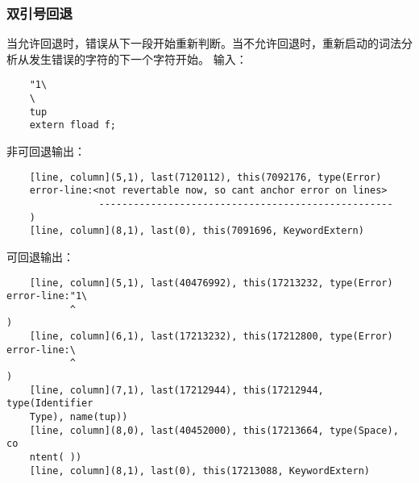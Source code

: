 \documentclass[UTF8]{ctexart}
\begin{document}
\subsubsection{双引号回退}
当允许回退时，错误从下一段开始重新判断。当不允许回退时，重新启动的词法分析从发生错误的字符的下一个字符开始。
输入：
{\firacode
\begin{lstlisting}
    "1\
    \
    tup
    extern fload f;
\end{lstlisting}
}

非可回退输出：
{\firacode
\begin{lstlisting}
    [line, column](5,1), last(7120112), this(7092176, type(Error)
    error-line:<not revertable now, so cant anchor error on lines>
                ---------------------------------------------------
    )
    [line, column](8,1), last(0), this(7091696, KeywordExtern)
\end{lstlisting}
}
可回退输出：
{\firacode
\begin{lstlisting}
    [line, column](5,1), last(40476992), this(17213232, type(Error)
error-line:"1\
           ^
)
    [line, column](6,1), last(17213232), this(17212800, type(Error)
error-line:\
           ^
)
    [line, column](7,1), last(17212944), this(17212944, type(Identifier
    Type), name(tup))
    [line, column](8,0), last(40452000), this(17213664, type(Space), co
    ntent( ))
    [line, column](8,1), last(0), this(17213088, KeywordExtern)
\end{lstlisting}
}
\end{document}
